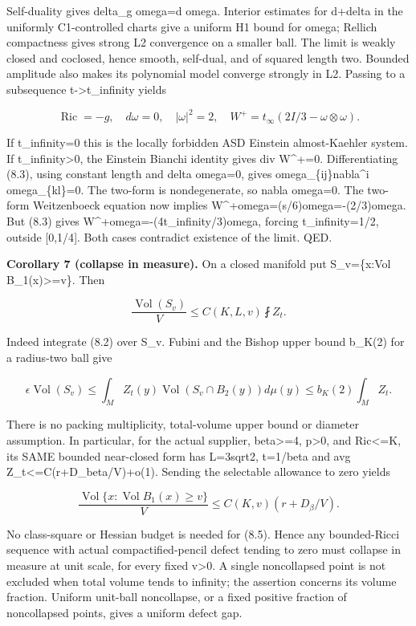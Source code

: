 \documentclass[
  10pt,
]{article}
\begin{document}
Self-duality gives \textbar delta\_g omega\textbar=\textbar d
omega\textbar. Interior estimates for d+delta in the uniformly
C1-controlled charts give a uniform H1 bound for omega; Rellich
compactness gives strong L2 convergence on a smaller ball. The limit is
weakly closed and coclosed, hence smooth, self-dual, and of squared
length two. Bounded amplitude also makes its polynomial model converge
strongly in L2. Passing to a subsequence t-\textgreater t\_infinity
yields

\[
 \operatorname{Ric}=-g,\quad d\omega=0,\quad |\omega|^2=2,
 \quad W^+=t_\infty(2I/3-\omega\otimes\omega).          \tag{8.3}
\]

If t\_infinity=0 this is the locally forbidden ASD Einstein
almost-Kaehler system. If t\_infinity\textgreater0, the Einstein Bianchi
identity gives div W\^{}+=0. Differentiating (8.3), using constant
length and delta omega=0, gives omega\_\{ij\}nabla\^{}i omega\_\{kl\}=0.
The two-form is nondegenerate, so nabla omega=0. The two-form
Weitzenboeck equation now implies W\^{}+omega=(s/6)omega=-(2/3)omega.
But (8.3) gives W\^{}+omega=-(4t\_infinity/3)omega, forcing
t\_infinity=1/2, outside {[}0,1/4{]}. Both cases contradict existence of
the limit. QED.

\textbf{Corollary 7 (collapse in measure).} On a closed manifold put
S\_v=\{x:Vol B\_1(x)\textgreater=v\}. Then

\[
 \boxed{\frac{\operatorname{Vol}(S_v)}V
       \le C(K,L,v)\fint Z_t.}                        \tag{8.4}
\]

Indeed integrate (8.2) over S\_v. Fubini and the Bishop upper bound
b\_K(2) for a radius-two ball give

\[
 \epsilon\operatorname{Vol}(S_v)
 \le\int_M Z_t(y)\operatorname{Vol}(S_v\cap B_2(y))d\mu(y)
 \le b_K(2)\int_M Z_t.
\]

There is no packing multiplicity, total-volume upper bound or diameter
assumption. In particular, for the actual supplier, beta\textgreater=4,
p\textgreater0, and \textbar Ric\textbar\textless=K, its SAME bounded
near-closed form has L=3sqrt2, t=1/beta and avg
Z\_t\textless=C(r+D\_beta/V)+o(1). Sending the selectable allowance to
zero yields

\[
 \boxed{\frac{\operatorname{Vol}\{x:\operatorname{Vol}B_1(x)\ge v\}}V
       \le C(K,v)(r+D_\beta/V).}                      \tag{8.5}
\]

No class-square or Hessian budget is needed for (8.5). Hence any
bounded-Ricci sequence with actual compactified-pencil defect tending to
zero must collapse in measure at unit scale, for every fixed
v\textgreater0. A single noncollapsed point is not excluded when total
volume tends to infinity; the assertion concerns its volume fraction.
Uniform unit-ball noncollapse, or a fixed positive fraction of
noncollapsed points, gives a uniform defect gap.
\end{document}
